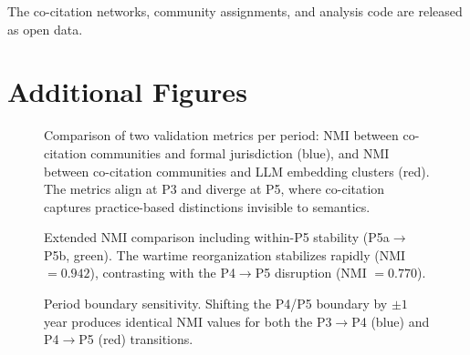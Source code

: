 \documentclass[11pt]{article}
\begin{document}
The co-citation networks, community assignments, and analysis code are released as open data.




\appendix
\section{Additional Figures}

\begin{figure}[ht]
\centering

\caption{Comparison of two validation metrics per period: NMI between co-citation communities and formal jurisdiction (blue), and NMI between co-citation communities and LLM embedding clusters (red). The metrics align at P3 and diverge at P5, where co-citation captures practice-based distinctions invisible to semantics.}
\label{fig:embed_comparison}
\end{figure}

\begin{figure}[ht]
\centering

\caption{Extended NMI comparison including within-P5 stability (P5a$\to$P5b, green). The wartime reorganization stabilizes rapidly (NMI $= 0.942$), contrasting with the P4$\to$P5 disruption (NMI $= 0.770$).}
\label{fig:nmi_extended}
\end{figure}

\begin{figure}[ht]
\centering

\caption{Period boundary sensitivity. Shifting the P4/P5 boundary by $\pm 1$ year produces identical NMI values for both the P3$\to$P4 (blue) and P4$\to$P5 (red) transitions.}
\label{fig:boundary}
\end{figure}
\end{document}
